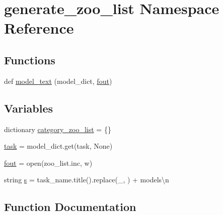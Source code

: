 \hypertarget{namespacegenerate__zoo__list}{}\section{generate\+\_\+zoo\+\_\+list Namespace Reference}
\label{namespacegenerate__zoo__list}
\subsection*{Functions}
\begin{DoxyCompactItemize}
\item 
def \hyperlink{namespacegenerate__zoo__list_a453b31f7a899a2ab380b3c1d84ad9b89}{model\+\_\+text} (model\+\_\+dict, \hyperlink{namespacegenerate__zoo__list_a856ce3399906c5da79bdf26a784249ae}{fout})
\end{DoxyCompactItemize}
\subsection*{Variables}
\begin{DoxyCompactItemize}
\item 
dictionary \hyperlink{namespacegenerate__zoo__list_a5fcda76c48a176fc2daa0d12a9602f49}{category\+\_\+zoo\+\_\+list} = \{\}
\item 
\hyperlink{namespacegenerate__zoo__list_ad3dbd35f1d59cff673fdcbc18b300da2}{task} = model\+\_\+dict.\+get(\textquotesingle{}task\textquotesingle{}, None)
\item 
\hyperlink{namespacegenerate__zoo__list_a856ce3399906c5da79bdf26a784249ae}{fout} = open(\textquotesingle{}zoo\+\_\+list.\+inc\textquotesingle{}, \textquotesingle{}w\textquotesingle{})
\item 
string \hyperlink{namespacegenerate__zoo__list_ab242661624dc2add618658bc9873f621}{s} = task\+\_\+name.\+title().replace(\textquotesingle{}\+\_\+\textquotesingle{}, \textquotesingle{} \textquotesingle{}) + \textquotesingle{} models\textbackslash{}n\textquotesingle{}
\end{DoxyCompactItemize}


\subsection{Function Documentation}
\mbox{\label{namespacegenerate__zoo__list_a453b31f7a899a2ab380b3c1d84ad9b89}} 
